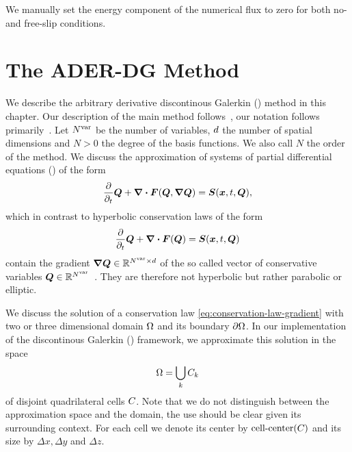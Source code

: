 We manually set the energy component of the numerical flux to zero for both no- and free-slip conditions.
\section{The ADER-DG Method}\label{sec:ader-dg}
We describe the arbitrary derivative discontinous Galerkin (\aderdg) method in this chapter.
Our description of the main method follows~\cite{dumbser2008unified,dumbser2010arbitrary,dumbser2018efficient}, our notation follows primarily~\cite{dumbser2018efficient}.
Let $N^{\text{var}}$ be the number of variables, $d$ the number of spatial dimensions and $N > 0$ the degree of the basis functions.
We also call $N$ the order of the method.
We discuss the approximation of systems of partial differential equations (\pde) of the form
\begin{equation}
  \label{eq:conservation-law-gradient}
 \frac{\partial}{\partial_t}  \Q + \div \flux(\Q, \gradQ) = \source(\bm{x}, t, \Q),
\end{equation}
which in contrast to hyperbolic conservation laws of the form
\begin{equation}
  \label{eq:conservation-law}
 \frac{\partial}{\partial_t}  \Q + \div \flux(\Q) = \source(\bm{x}, t, \Q)
\end{equation}
contain the gradient $\gradQ \in \mathbb{R}^{\NVar \times \dimensions}$ of the so called vector of conservative variables $\bm{Q} \in \mathbb{R}^{N^{\text{var}}}$~\cite{dumbser2010arbitrary}.
They are therefore not hyperbolic but rather parabolic or elliptic.

We discuss the solution of a conservation law \cref{eq:conservation-law-gradient} with two or three dimensional domain $\Omega$ and its boundary $\partial \Omega$.
In our implementation of the discontinous Galerkin (\dg) framework, we approximate this solution in the space
\begin{equation}
  \label{eq:dg-space}
  \broken = \bigcup_k \cell[k]
\end{equation}
of disjoint quadrilateral cells $C_{}$.
Note that we do not distinguish between the approximation space and the domain, the use should be clear given its surrounding context.
For each cell we denote its center by $\operatorname{cell-center} (C_{})$ and its size by $\Delta x, \Delta y$ and $\Delta z$.

